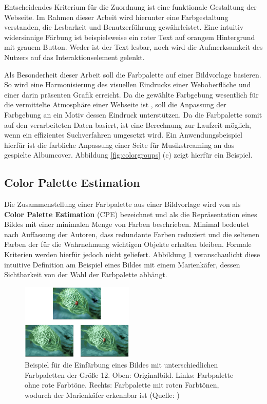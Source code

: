 \documentclass[11pt,a4paper,bibliography=totoc,twocolumn]{scrartcl}
\begin{document}
Entscheidendes Kriterium für die Zuordnung ist eine funktionale Gestaltung der Webseite. Im Rahmen dieser Arbeit wird hierunter eine Farbgestaltung verstanden, die Lesbarkeit und Benutzerführung gewährleistet. Eine intuitiv widersinnige Färbung ist beispielsweise ein roter Text auf orangem Hintergrund mit grauem Button. Weder ist der Text lesbar, noch wird die Aufmerksamkeit des Nutzers auf das Interaktionselement gelenkt.

Als Besonderheit dieser Arbeit soll die Farbpalette auf einer Bildvorlage basieren. So wird eine Harmonisierung des visuellen Eindrucks einer Weboberfläche und einer darin präsenten Grafik erreicht. Da die gewählte Farbgebung wesentlich für die vermittelte Atmosphäre einer Webseite ist \citep{webdesign}, soll die Anpassung der Farbgebung an ein Motiv dessen Eindruck unterstützen. Da die Farbpalette somit auf den verarbeiteten Daten basiert, ist eine Berechnung zur Laufzeit möglich, wenn ein effizientes Suchverfahren umgesetzt wird. Ein Anwendungsbeispiel hierfür ist die farbliche Anpassung einer Seite für Musikstreaming an das gespielte Albumcover. Abbildung \ref{fig:colorgroups} (c) zeigt hierfür ein Beispiel.

\subsection{Color Palette Estimation}

Die Zusammenstellung einer Farbpalette aus einer Bildvorlage wird von \citet{acopa} als \textbf{Color Palette Estimation} (CPE) bezeichnet und als die Repräsentation eines Bildes mit einer minimalen Menge von Farben beschrieben. \glqq{}Minimal\grqq{} bedeutet nach Auffassung der Autoren, dass redundante Farben reduziert und die seltenen Farben der für die Wahrnehmung wichtigen Objekte erhalten bleiben. Formale Kriterien werden hierfür jedoch nicht geliefert. Abbildung \ref{fig:ladybug} veranschaulicht diese intuitive Definition am Beispiel eines Bildes mit einem Marienkäfer, dessen Sichtbarkeit von der Wahl der Farbpalette abhängt.

\begin{figure}[h]
\centering
\includegraphics[width=0.48\textwidth]{img/ladybug.png}
\caption{Beispiel für die Einfärbung eines Bildes mit unterschiedlichen Farbpaletten der Größe 12. Oben: Originalbild. Links: Farbpalette ohne rote Farbtöne. Rechts: Farbpalette mit roten Farbtönen, wodurch der Marienkäfer erkennbar ist (Quelle: \citep{acopa})}
\label{fig:ladybug}
\end{figure}
\end{document}
